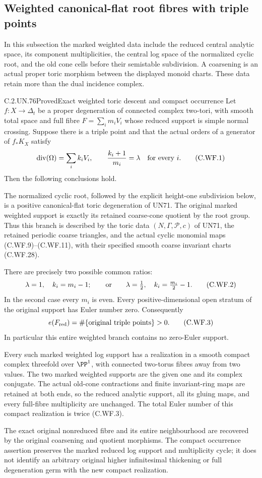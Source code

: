 \subsection{Weighted canonical-flat root fibres with triple points}

In this subsection the marked weighted data include the reduced
central analytic space, its component multiplicities, the central
log space of the normalized cyclic root, and the old cone cells
before their semistable subdivision.  A coarsening is an actual
proper toric morphism between the displayed monoid charts.  These
data retain more than the dual incidence complex.

\begin{statement}{C.2.UN.76}{Proved}{Exact weighted toric descent and compact occurrence}
Let \(f:X\to\Delta_t\) be a proper degeneration of connected complex
two-tori, with smooth total space and full fibre
\(F=\sum_i m_iV_i\) whose reduced support is simple normal crossing.
Suppose there is a triple point and that the actual orders of a
generator of \(f_*K_X\) satisfy
\[
 \operatorname{div}(\Omega)=\sum_i k_iV_i,\qquad
 \frac{k_i+1}{m_i}=\lambda\quad\hbox{for every }i.
\tag{C.WF.1}
\]
Then the following conclusions hold.

The normalized cyclic root, followed by the explicit height-one
subdivision below, is a positive canonical-flat toric degeneration
of UN71.  The original marked weighted support is exactly its
retained coarse-cone quotient by the root group.  Thus this branch
is described by the toric data \((N,\Gamma,\mathscr P,c)\) of UN71,
the retained periodic coarse triangles, and the actual cyclic
monomial maps (C.WF.9)--(C.WF.11), with their specified smooth
coarse invariant charts (C.WF.28).

There are precisely two possible common ratios:
\[
 \lambda=1,\quad k_i=m_i-1;
 \qquad\hbox{or}\qquad
 \lambda=\tfrac12,\quad k_i=\tfrac{m_i}{2}-1.
\tag{C.WF.2}
\]
In the second case every \(m_i\) is even.  Every positive-dimensional
open stratum of the original support has Euler number zero.
Consequently
\[
             e(F_{\mathrm{red}})
               =\#\{\hbox{original triple points}\}>0.
\tag{C.WF.3}
\]
In particular this entire weighted branch contains no zero-Euler
support.

Every such marked weighted log support has a realization in a
smooth compact complex threefold over \(\PP^1\), with connected
two-torus fibres away from two values.  The two marked weighted
supports are the given one and its complex conjugate.  The actual
old-cone contractions and finite invariant-ring maps are retained
at both ends, so the reduced analytic support, all its gluing maps,
and every full-fibre multiplicity are unchanged.  The total Euler
number of this compact realization is twice (C.WF.3).

The exact original nonreduced fibre and its entire neighbourhood
are recovered by the original coarsening and quotient morphisms.
The compact occurrence assertion preserves the marked reduced
log support and multiplicity cycle; it does not identify an
arbitrary original higher infinitesimal thickening or full
degeneration germ with the new compact realization.
\end{statement}

